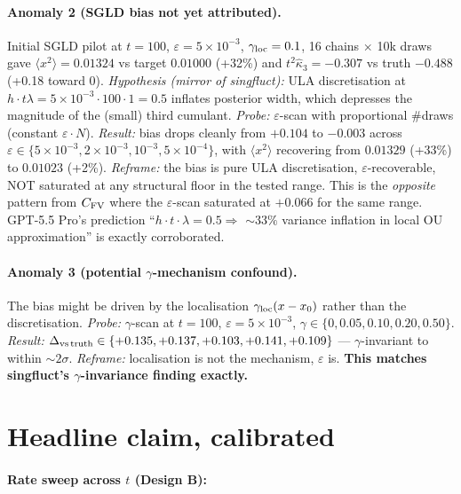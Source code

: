 \documentclass[11pt]{article}
\begin{document}
\paragraph{Anomaly 2 (SGLD bias not yet attributed).}
Initial SGLD pilot at $t = 100$, $\varepsilon = 5{\times}10^{-3}$,
$\gamma_{\rm loc} = 0.1$, 16 chains $\times$ 10k draws gave
$\langle x^2 \rangle = 0.01324$ vs target $0.01000$ (+32\%) and
$t^2 \hat\kappa_3 = -0.307$ vs truth $-0.488$ (+0.18 toward 0).
\emph{Hypothesis (mirror of singfluct):} ULA discretisation at
$h \cdot t \lambda = 5{\times}10^{-3} \cdot 100 \cdot 1 = 0.5$
inflates posterior width, which depresses the magnitude of the
(small) third cumulant. \emph{Probe:} $\varepsilon$-scan with
proportional \#draws (constant $\varepsilon \cdot N$).
\emph{Result:} bias drops cleanly from $+0.104$ to $-0.003$ across
$\varepsilon \in \{5{\times}10^{-3}, 2{\times}10^{-3}, 10^{-3},
5{\times}10^{-4}\}$, with $\langle x^2 \rangle$ recovering from
$0.01329$ (+33\%) to $0.01023$ (+2\%). \emph{Reframe:} the bias
is pure ULA discretisation, $\varepsilon$-recoverable, NOT saturated
at any structural floor in the tested range. This is the
\emph{opposite} pattern from $C_{\rm FV}$ where the $\varepsilon$-scan
saturated at $+0.066$ for the same range. GPT-5.5 Pro's prediction
``$h \cdot t \cdot \lambda = 0.5 \Rightarrow$ $\sim 33\%$ variance
inflation in local OU approximation'' is exactly corroborated.

\paragraph{Anomaly 3 (potential $\gamma$-mechanism confound).}
The bias might be driven by the localisation $\gamma_{\rm loc}(x - x_0)$
rather than the discretisation. \emph{Probe:} $\gamma$-scan at
$t = 100$, $\varepsilon = 5{\times}10^{-3}$, $\gamma \in
\{0, 0.05, 0.10, 0.20, 0.50\}$. \emph{Result:} $\Delta_{\rm vs\,truth}
\in \{+0.135, +0.137, +0.103, +0.141, +0.109\}$ --- $\gamma$-invariant
to within $\sim 2\sigma$. \emph{Reframe:} localisation is not the
mechanism, $\varepsilon$ is. \textbf{This matches singfluct's
$\gamma$-invariance finding exactly.}

\section{Headline claim, calibrated}

\paragraph{Rate sweep across $t$ (Design B):}
\end{document}

